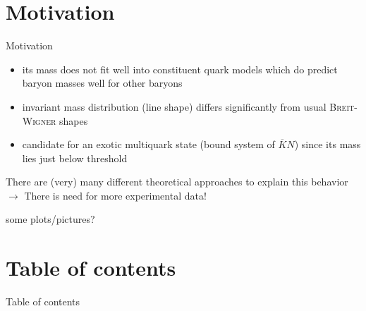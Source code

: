 \documentclass[11pt,aspectratio=1610,dvipsnames]{beamer}
\begin{document}
\section*{Motivation}
\begin{frame}{Motivation}
\begin{minipage}{\linewidth}
		\begin{tcolorbox}[colback=black!10,colframe=gray!20!black,title=What is special about the $\Lambda(1405)$?] 
			\begin{itemize}
				\item its mass does not fit well into constituent quark models which do predict baryon masses well for other baryons 
				\item invariant mass distribution (line shape) differs significantly from usual \textsc{Breit-Wigner} shapes
				\item candidate for an exotic multiquark state (bound system of $\overline{K}N$) since its mass lies just below threshold
			
 			\end{itemize}
 		\vspace{.5cm}
 		There are (very) many different theoretical approaches to explain this behavior\\
 		$\to$ There is need for more experimental data!
		\end{tcolorbox}
	{\color{red} some plots/pictures?}
\end{minipage}




	
\end{frame}
\section*{Table of contents}
\begin{frame}{Table of contents}
	\tableofcontents
\end{frame}
\end{document}
